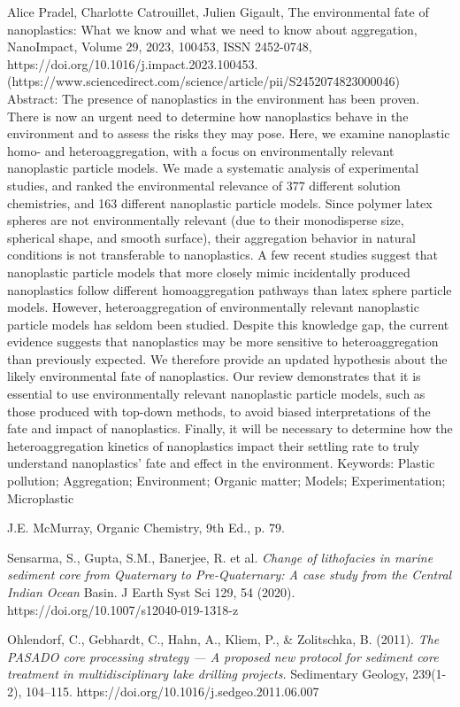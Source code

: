 \documentclass[twocolumn,a4paper,aps,amsmath,amssymb,floatfix,superscriptaddress]{revtex4-2}
\begin{document}
\begin{thebibliography}{10}
		Alice Pradel, Charlotte Catrouillet, Julien Gigault,
		The environmental fate of nanoplastics: What we know and what we need to know about aggregation,
		NanoImpact,
		Volume 29,
		2023,
		100453,
		ISSN 2452-0748,
		https://doi.org/10.1016/j.impact.2023.100453.
		(https://www.sciencedirect.com/science/article/pii/S2452074823000046)
		Abstract: The presence of nanoplastics in the environment has been proven. There is now an urgent need to determine how nanoplastics behave in the environment and to assess the risks they may pose. Here, we examine nanoplastic homo- and heteroaggregation, with a focus on environmentally relevant nanoplastic particle models. We made a systematic analysis of experimental studies, and ranked the environmental relevance of 377 different solution chemistries, and 163 different nanoplastic particle models. Since polymer latex spheres are not environmentally relevant (due to their monodisperse size, spherical shape, and smooth surface), their aggregation behavior in natural conditions is not transferable to nanoplastics. A few recent studies suggest that nanoplastic particle models that more closely mimic incidentally produced nanoplastics follow different homoaggregation pathways than latex sphere particle models. However, heteroaggregation of environmentally relevant nanoplastic particle models has seldom been studied. Despite this knowledge gap, the current evidence suggests that nanoplastics may be more sensitive to heteroaggregation than previously expected. We therefore provide an updated hypothesis about the likely environmental fate of nanoplastics. Our review demonstrates that it is essential to use environmentally relevant nanoplastic particle models, such as those produced with top-down methods, to avoid biased interpretations of the fate and impact of nanoplastics. Finally, it will be necessary to determine how the heteroaggregation kinetics of nanoplastics impact their settling rate to truly understand nanoplastics' fate and effect in the environment.
		Keywords: Plastic pollution; Aggregation; Environment; Organic matter; Models; Experimentation; Microplastic
		
		J.E. McMurray, Organic Chemistry, 9th Ed., p. 79.
		
		Sensarma, S., Gupta, S.M., Banerjee, R. et al. \textit{Change of lithofacies in marine sediment core from Quaternary to Pre-Quaternary: A case study from the Central Indian Ocean} Basin. J Earth Syst Sci 129, 54 (2020). https://doi.org/10.1007/s12040-019-1318-z 
		
		Ohlendorf, C., Gebhardt, C., Hahn, A., Kliem, P., \& Zolitschka, B. (2011). \textit{The PASADO core processing strategy — A proposed new protocol for sediment core treatment in multidisciplinary lake drilling projects.} Sedimentary Geology, 239(1-2), 104–115. https://doi.org/10.1016/j.sedgeo.2011.06.007
	\end{thebibliography}
	
\end{document}
